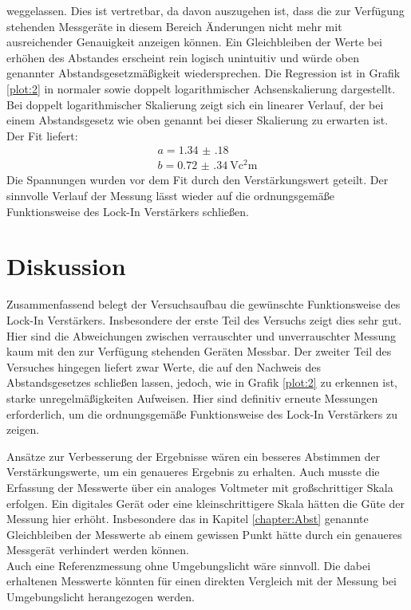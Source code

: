 weggelassen. Dies ist vertretbar, da davon auszugehen ist, dass die zur Verfügung stehenden Messgeräte in diesem Bereich Änderungen nicht
mehr mit ausreichender Genauigkeit anzeigen können. Ein Gleichbleiben der Werte bei erhöhen des Abstandes
erscheint rein logisch unintuitiv und würde oben genannter Abstandsgesetzmäßigkeit wiedersprechen. Die Regression ist
in Grafik \ref{plot:2} in normaler sowie doppelt logarithmischer Achsenskalierung dargestellt.
Bei doppelt logarithmischer Skalierung zeigt sich ein linearer Verlauf, der bei einem Abstandsgesetz wie oben genannt
bei dieser Skalierung zu erwarten ist. Der Fit liefert:
\begin{equation*}
  \begin{split}
    a = \num{1.34(18)}\\
    b = \SI{0.72(34)}{\volt\square\centi\metre}
  \end{split}
\end{equation*}
Die Spannungen wurden vor dem Fit durch den Verstärkungswert geteilt. Der sinnvolle Verlauf der Messung
lässt wieder auf die ordnungsgemäße Funktionsweise des Lock-In Verstärkers schließen.
\section{Diskussion}
Zusammenfassend belegt der Versuchsaufbau die gewünschte Funktionsweise des Lock-In Verstärkers. Insbesondere der erste Teil
des Versuchs zeigt dies sehr gut. Hier sind die Abweichungen zwischen verrauschter und unverrauschter Messung kaum mit
den zur Verfügung stehenden Geräten Messbar. Der zweiter Teil des Versuches hingegen liefert zwar
Werte, die auf den Nachweis des Abstandsgesetzes schließen lassen, jedoch, wie in Grafik \ref{plot:2} zu erkennen ist,
starke unregelmäßigkeiten Aufweisen. Hier sind definitiv erneute Messungen erforderlich, um
die ordnungsgemäße Funktionsweise des Lock-In Verstärkers zu zeigen.

Ansätze zur Verbesserung der Ergebnisse wären ein besseres Abstimmen der Verstärkungswerte, um ein
genaueres Ergebnis zu erhalten. Auch musste die Erfassung der Messwerte über ein analoges
Voltmeter mit großschrittiger Skala erfolgen. Ein digitales Gerät oder eine kleinschrittigere
Skala hätten die Güte der Messung hier erhöht. Insbesondere das in Kapitel \ref{chapter:Abst}
genannte Gleichbleiben der Messwerte ab einem gewissen Punkt hätte durch ein genaueres
Messgerät verhindert werden können.\\
Auch eine Referenzmessung ohne Umgebungslicht wäre sinnvoll. Die dabei erhaltenen
Messwerte könnten für einen direkten Vergleich mit der Messung bei Umgebungslicht herangezogen werden.

\newpage
\nocite{*}
\printbibliography
